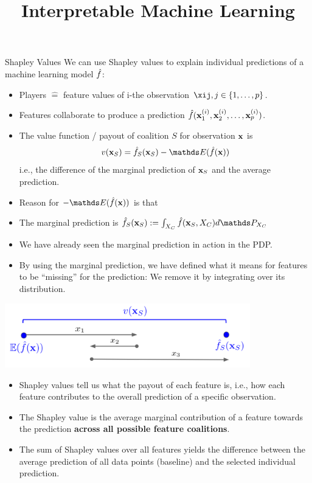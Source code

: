 \documentclass[11pt,compress,t,notes=noshow, xcolor=table]{beamer}
\title{Interpretable Machine Learning}
\institute{\href{https://compstat-lmu.github.io/lecture_i2ml/}{compstat-lmu.github.io/lecture\_i2ml}}
\date{}
\begin{document}

\begin{vbframe}{Shapley Values}
We can use Shapley values to explain individual predictions of a machine learning model $\fh$: 
\begin{itemize}
  \item Players $\hat{=}$ feature values of i-the observation $\xij, j \in \pset$.
  \item Features collaborate to produce a prediction $\fh(\xi_1, \xi_2, \ldots, \xi_p)$.
  \item The value function / payout of coalition $S$ for observation $\xv$ is 
  $$v(\xv_S) =  \fh_{S} (\xv_S) - \E (\fh(\xv))$$ 
  i.e., the difference of the marginal prediction of $\xv_S$ and the average prediction.
\item Reason for $ - \E(\fh(\xv))$ is that 
\item The marginal prediction is $\fh_{S}(\xv_S) := \int_{X_C} \fh(\xv_S, X_C)d \P_{X_C}$
\item We have already seen the marginal prediction in action in the PDP.
\item By using the marginal prediction, we have defined what it means for features to be \enquote{missing} for the prediction: We remove it by integrating over its distribution.
\end{itemize}
\begin{center}
\vspace{-0.3cm}
\includegraphics[width=0.8\textwidth]{figure_man/shapley_valuefct}
\end{center}

\begin{itemize}
 \item Shapley values tell us what the payout of each feature is, i.e., how each feature contributes to the overall prediction of a specific observation.  
    \item The Shapley value is the average marginal contribution of a feature towards the prediction \textbf{across all possible feature coalitions}.
    \item The sum of Shapley values over all features yields the difference between the average prediction of all data points (baseline) and the selected individual prediction.
  \end{itemize}
\end{vbframe}
\end{document}
